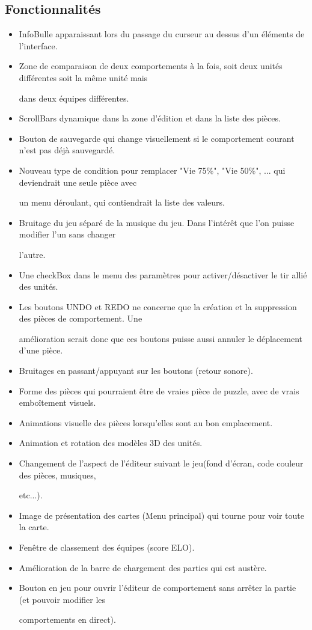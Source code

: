 \documentclass{report}
\begin{document}
\subsection{Fonctionnalités}
\begin{itemize}
\item InfoBulle apparaissant lors du passage du curseur au dessus d'un éléments de l'interface. 
\item Zone de comparaison de deux comportements à la fois, soit deux unités différentes soit la même unité mais 

dans deux équipes différentes.
\item ScrollBars dynamique dans la zone d'édition et dans la liste des pièces.
\item Bouton de sauvegarde qui change visuellement si le comportement courant n'est pas déjà sauvegardé.
\item Nouveau type de condition pour remplacer "Vie 75\%", "Vie 50\%", ... qui deviendrait une seule pièce avec 

un menu déroulant, qui contiendrait la liste des valeurs. 
\item Bruitage du jeu séparé de la musique du jeu. Dans l’intérêt que l'on puisse modifier l'un sans changer 

l'autre.
\item Une checkBox dans le menu des paramètres pour activer/désactiver le tir allié des unités.
\item Les boutons UNDO et REDO ne concerne que la création et la suppression des pièces de comportement. Une 

amélioration serait donc que ces boutons puisse aussi annuler le déplacement d'une pièce.
\item Bruitages en passant/appuyant sur les boutons (retour sonore).
\item Forme des pièces qui pourraient être de vraies pièce de puzzle, avec de vrais emboîtement visuels.
\item Animations visuelle des pièces lorsqu'elles sont au bon emplacement.
\item Animation et rotation des modèles 3D des unités.
\item Changement de l'aspect de l'éditeur suivant le jeu(fond d'écran, code couleur des pièces, musiques, 

etc...).
\item Image de présentation des cartes (Menu principal) qui tourne pour voir toute la carte.
\item Fenêtre de classement des équipes (score ELO).
\item Amélioration de la barre de chargement des parties qui est austère.
\item Bouton en jeu pour ouvrir l'éditeur de comportement sans arrêter la partie (et pouvoir modifier les 

comportements en direct).
\end{itemize}
\end{document}
